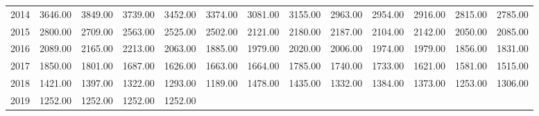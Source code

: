\begin{longtable}{rrrrrrrrrrrrr}
  2014 & 3646.00 & 3849.00 & 3739.00 & 3452.00 & 3374.00 & 3081.00 & 3155.00 & 2963.00 & 2954.00 & 2916.00 & 2815.00 & 2785.00 \\ 
  2015 & 2800.00 & 2709.00 & 2563.00 & 2525.00 & 2502.00 & 2121.00 & 2180.00 & 2187.00 & 2104.00 & 2142.00 & 2050.00 & 2085.00 \\ 
  2016 & 2089.00 & 2165.00 & 2213.00 & 2063.00 & 1885.00 & 1979.00 & 2020.00 & 2006.00 & 1974.00 & 1979.00 & 1856.00 & 1831.00 \\ 
  2017 & 1850.00 & 1801.00 & 1687.00 & 1626.00 & 1663.00 & 1664.00 & 1785.00 & 1740.00 & 1733.00 & 1621.00 & 1581.00 & 1515.00 \\ 
  2018 & 1421.00 & 1397.00 & 1322.00 & 1293.00 & 1189.00 & 1478.00 & 1435.00 & 1332.00 & 1384.00 & 1373.00 & 1253.00 & 1306.00 \\ 
  2019 & 1252.00 & 1252.00 & 1252.00 & 1252.00 &  &  &  &  &  &  &  &  \\ 
   \hline
\hline
\end{longtable}

